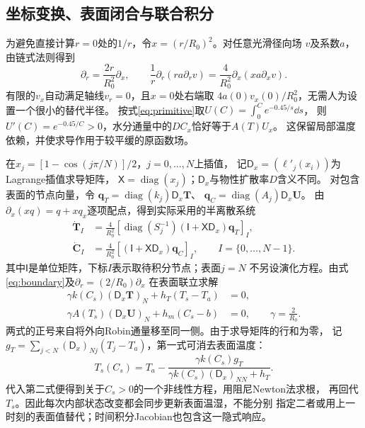 \subsection{坐标变换、表面闭合与联合积分}
为避免直接计算$r=0$处的$1/r$，令$x=(r/R_0)^2$。对任意光滑径向场
$v$及系数$a$，由链式法则得到
\begin{equation}
\partial_r=\frac{2r}{R_0^2}\partial_x,\qquad
\frac1r\partial_r(ra\partial_rv)
=\frac4{R_0^2}\partial_x(xa\partial_xv).
\label{eq:q2-coordinate}
\end{equation}
有限的$v_x$自动满足轴线$v_r=0$，且$x=0$处右端取
$4a(0)v_x(0)/R_0^2$，无需人为设置一个很小的替代半径。
按式\eqref{eq:primitive}取$U(C)=\int_0^C e^{-0.45/s}\dd s$，
则$U'(C)=e^{-0.45/C}>0$，水分通量中的$D C_x$恰好等于$A(T)U_x$。
这保留局部温度依赖，并使求导作用于较平缓的原函数场。

在$x_j=[1-\cos(j\pi/N)]/2$，$j=0,\ldots,N$上插值，
记$\mathsf D_x=(\ell'_j(x_i))$为Lagrange插值求导矩阵，
$\mathsf X=\operatorname{diag}(x_j)$；$\mathsf D_x$与物性扩散率$D$含义不同。
对包含表面的节点向量，令
$\boldsymbol q_T=\operatorname{diag}(k_j)\mathsf D_x\boldsymbol T$、
$\boldsymbol q_C=\operatorname{diag}(A_j)\mathsf D_x\boldsymbol U$。
由$\partial_x(xq)=q+xq_x$逐项配点，得到实际采用的半离散系统
\begin{equation}
\begin{aligned}
\dot{\boldsymbol T}_{I}
&=\frac4{R_0^2}
 \left[\operatorname{diag}(S_j^{-1})
 (\mathsf I+\mathsf X\mathsf D_x)\boldsymbol q_T\right]_{I},\\
\dot{\boldsymbol C}_{I}
&=\frac4{R_0^2}
 \left[(\mathsf I+\mathsf X\mathsf D_x)\boldsymbol q_C\right]_{I},
\qquad I=\{0,\ldots,N-1\}.
\end{aligned}
\label{eq:q2-semidscrete}
\end{equation}
其中$\mathsf I$是单位矩阵，下标$I$表示取待积分节点；表面$j=N$
不另设演化方程。由式\eqref{eq:boundary}及$\partial_r=(2/R_0)\partial_x$
在表面联立求解
\begin{equation}
\begin{aligned}
\gamma k(C_s)(\mathsf D_x\boldsymbol T)_N+h_T(T_s-T_a)&=0,\\
\gamma A(T_s)(\mathsf D_x\boldsymbol U)_N+h_m(C_s-b)&=0,
\qquad\gamma=\frac2{R_0}.
\end{aligned}
\label{eq:q2-robin}
\end{equation}
两式的正号来自将外向Robin通量移至同一侧。由于求导矩阵的行和为零，
记$g_T=\sum_{j<N}(\mathsf D_x)_{Nj}(T_j-T_a)$，第一式可消去表面温度：
\begin{equation}
T_s(C_s)=T_a-
\frac{\gamma k(C_s)g_T}{\gamma k(C_s)(\mathsf D_x)_{NN}+h_T}.
\label{eq:q2-surface-elimination}
\end{equation}
代入第二式便得到关于$C_s>0$的一个非线性方程，用阻尼Newton法求根，
再回代$T_s$。因此每次内部状态改变都会同步更新表面温湿，不能分别
指定二者或用上一时刻的表面值替代；时间积分Jacobian也包含这一隐式响应。

